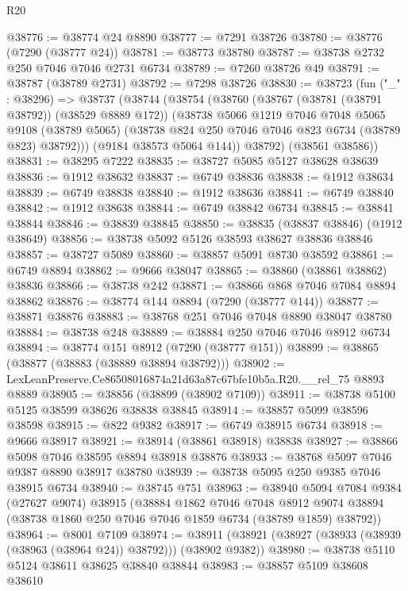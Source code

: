 \begin{lexlean}{R20}
\begin{coremodule}
{@38776 := @38774 @24 @8890
@38777 := @7291 @38726
@38780 := @38776 (@7290 (@38777 @24))
@38781 := @38773 @38780
@38787 := @38738 @2732 @250 @7046 @7046 @2731 @6734
@38789 := @7260 @38726 @49
@38791 := @38787 (@38789 @2731)
@38792 := @7298 @38726
@38830 := @38723
    (fun ("_" : @38296) =>
    @38737
      (@38744
        (@38754
          (@38760
            (@38767 (@38781 (@38791 @38792)) (@38529 @8889 @172))
            (@38738
              @5066
              @1219
              @7046
              @7048
              @5065
              @9108
              (@38789 @5065)
              (@38738 @824 @250 @7046 @7046 @823 @6734 (@38789 @823) @38792)))
          (@9184 @38573 @5064 @144))
        @38792)
      (@38561 @38586))
@38831 := @38295 @7222
@38835 := @38727 @5085 @5127 @38628 @38639
@38836 := @1912 @38632
@38837 := @6749 @38836
@38838 := @1912 @38634
@38839 := @6749 @38838
@38840 := @1912 @38636
@38841 := @6749 @38840
@38842 := @1912 @38638
@38844 := @6749 @38842 @6734
@38845 := @38841 @38844
@38846 := @38839 @38845
@38850 := @38835 (@38837 @38846) (@1912 @38649)
@38856 := @38738 @5092 @5126 @38593 @38627 @38836 @38846
@38857 := @38727 @5089
@38860 := @38857 @5091 @8730 @38592
@38861 := @6749 @8894
@38862 := @9666 @38047
@38865 := @38860 (@38861 @38862) @38836
@38866 := @38738 @242
@38871 := @38866 @868 @7046 @7084 @8894 @38862
@38876 := @38774 @144 @8894 (@7290 (@38777 @144))
@38877 := @38871 @38876
@38883 := @38768 @251 @7046 @7048 @8890 @38047 @38780
@38884 := @38738 @248
@38889 := @38884 @250 @7046 @7046 @8912 @6734
@38894 := @38774 @151 @8912 (@7290 (@38777 @151))
@38899 := @38865 (@38877 (@38883 (@38889 @38894 @38792)))
@38902 := LexLeanPreserve.Ce86508016874a21d63a87c67bfe10b5a.R20.__rel_75 @8893 @8889
@38905 := @38856 (@38899 (@38902 @7109))
@38911 := @38738 @5100 @5125 @38599 @38626 @38838 @38845
@38914 := @38857 @5099 @38596 @38598
@38915 := @822 @9382
@38917 := @6749 @38915 @6734
@38918 := @9666 @38917
@38921 := @38914 (@38861 @38918) @38838
@38927 := @38866 @5098 @7046 @38595 @8894 @38918 @38876
@38933 := @38768 @5097 @7046 @9387 @8890 @38917 @38780
@38939 := @38738 @5095 @250 @9385 @7046 @38915 @6734
@38940 := @38745 @751
@38963 := @38940
    @5094
    @7084
    @9384
    (@27627 @9074)
    @38915
    (@38884
      @1862
      @7046
      @7048
      @8912
      @9074
      @38894
      (@38738 @1860 @250 @7046 @7046 @1859 @6734 (@38789 @1859) @38792))
@38964 := @8001 @7109
@38974 := @38911 (@38921 (@38927 (@38933 (@38939 (@38963 (@38964 @24)) @38792))) (@38902 @9382))
@38980 := @38738 @5110 @5124 @38611 @38625 @38840 @38844
@38983 := @38857 @5109 @38608 @38610
}
\end{coremodule}
\end{lexlean}
